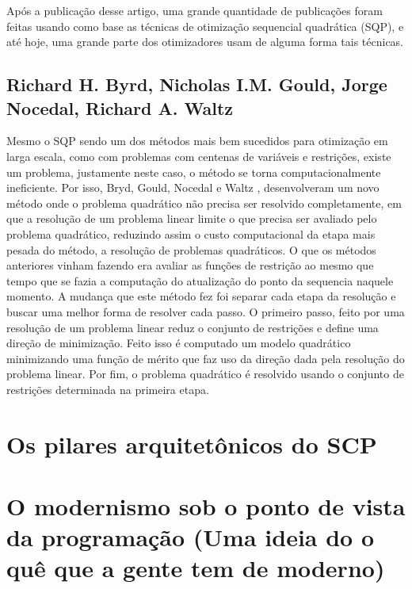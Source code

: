 Após a publicação desse artigo, uma grande quantidade de publicações foram feitas usando como
base as técnicas de otimização sequencial quadrática (SQP), e até hoje, uma grande parte dos
otimizadores usam de alguma forma tais técnicas.

\subsection{Richard H. Byrd, Nicholas I.M. Gould, Jorge Nocedal, Richard A. Waltz}
Mesmo o SQP sendo um dos métodos mais bem sucedidos para otimização em larga escala, como com
problemas com centenas de variáveis e restrições, existe um problema, justamente neste caso, o
método se torna computacionalmente ineficiente. Por isso, Bryd, Gould, Nocedal e
Waltz \cite{byrd2003algorithm}, desenvolveram um novo método onde o problema quadrático não precisa
ser resolvido completamente, em que a resolução de um problema linear limite o que precisa ser
avaliado pelo problema quadrático, reduzindo assim o custo computacional da etapa mais pesada do
método, a resolução de problemas quadráticos. O que os métodos anteriores vinham fazendo era avaliar
as funções de restrição ao mesmo que tempo que se fazia a computação do atualização do ponto da
sequencia naquele momento. A mudança que este método fez foi separar cada etapa da resolução e
buscar uma melhor forma de resolver cada passo. O primeiro passo, feito por uma resolução de um
problema linear reduz o conjunto de restrições e define uma direção de minimização. Feito isso é
computado um modelo quadrático minimizando uma função de mérito que faz uso da direção dada pela
resolução do problema linear. Por fim, o problema quadrático é resolvido usando o conjunto de
restrições determinada na primeira etapa.


\section{Os pilares arquitetônicos do SCP}
\section{O modernismo sob o ponto de vista da programação (Uma ideia do o quê que a gente tem de moderno)}
